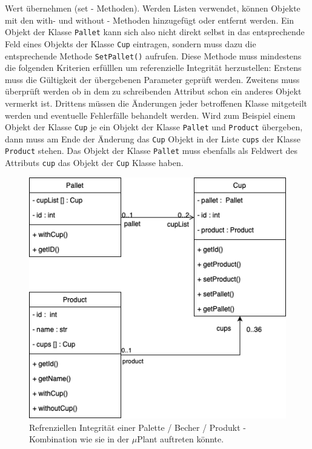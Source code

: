 Wert übernehmen (set - Methoden).
Werden Listen verwendet, können Objekte mit den with- und without - Methoden hinzugefügt oder entfernt werden.
Ein Objekt der Klasse \verb|Pallet| kann sich also nicht direkt selbst in das entsprechende Feld eines Objekts der Klasse
\verb|Cup| eintragen, sondern muss dazu die entsprechende Methode \verb|SetPallet()| aufrufen.
Diese Methode muss mindestens die folgenden Kriterien erfülllen um referenzielle Integrität herzustellen:
Erstens muss die Gültigkeit der übergebenen Parameter geprüft werden.
Zweitens muss überprüft werden ob in dem zu schreibenden Attribut schon ein anderes Objekt vermerkt ist.
Drittens müssen die Änderungen jeder betroffenen Klasse mitgeteilt werden und eventuelle Fehlerfälle behandelt werden.
Wird zum Beispiel einem Objekt der Klasse \verb|Cup| je ein Objekt der Klasse  \verb|Pallet| und \verb|Product|
übergeben, dann muss am Ende der Änderung das \verb|Cup| Objekt in der Liste \verb|cups| der Klasse \verb|Product| stehen.
Das Objekt der Klasse \verb|Pallet| muss ebenfalls als Feldwert des Attributs \verb|cup| das Objekt der \verb|Cup| Klasse haben.\\

\vspace{1cm}
\begin{figure}
        \caption[Beispiel: Referenzielle Integrität]
        {\small Refrenziellen Integrität einer Palette / Becher / Produkt - Kombination wie sie in der $\mu$Plant
        auftreten könnte. }\label{fig:figure9}
        \includegraphics[width = \textwidth ]{Bilder/BeispielRefInt}
        \centering
\end{figure}


